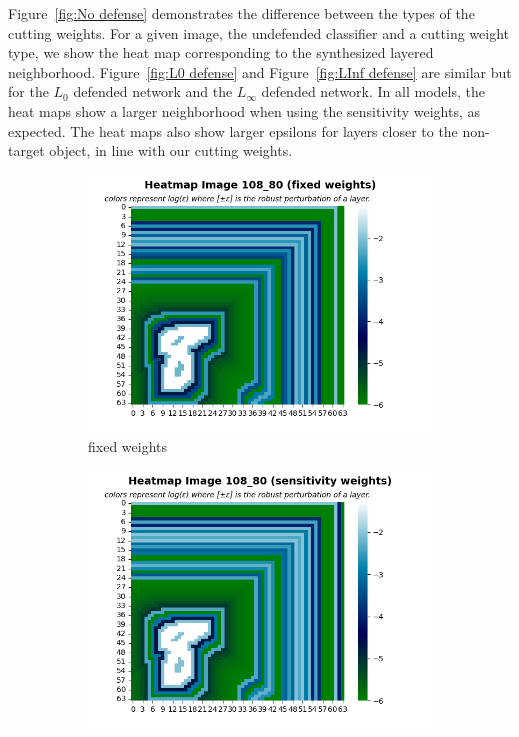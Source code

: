 Figure~\ref{fig:No defense} demonstrates the difference between the types of the cutting weights.
  For a given image, the undefended classifier and a cutting weight type, we show the heat map corresponding to the synthesized layered neighborhood.
  Figure~\ref{fig:L0 defense} and Figure~\ref{fig:LInf defense} are similar but for the $L_0$ defended network
   and the $L_{\infty}$ defended network.
  In all models, the heat maps show a larger neighborhood when using the sensitivity weights, as expected.
  The heat maps also show larger epsilons for layers closer to the non-target object, in line with our cutting weights. 
    \begin{figure}
         \centering
         \begin{subfigure}[b]{0.4\textwidth}
             \centering
             \includegraphics[width=\textwidth]{no_defense_fixed_weights.png}
             \caption{fixed weights}
             \label{sub-fig:No defense FW}
         \end{subfigure}
         \hfill
         \begin{subfigure}[b]{0.4\textwidth}
             \centering
             \includegraphics[width=\textwidth]{no_defense_sensitivity_weights.png}

\end{subfigure}
\end{figure}
